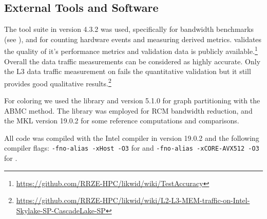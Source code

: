 \subsection{External Tools and Software}
The \LIKWID \cite{LIKWID} tool suite in version 4.3.2 was used, specifically
\likwidBench for bandwidth benchmarks (see ), and
\likwidPerfctr for counting hardware events 
 and measuring derived metrics.
 \LIKWID validates the quality of it's performance metrics
  and validation data is publicly available.\footnote{\href{https://github.com/RRZE-HPC/likwid/wiki/TestAccuracy}{https://github.com/RRZE-HPC/likwid/wiki/TestAccuracy}} Overall the \LIKWID data traffic measurements can be considered as highly accurate. Only the L3 data traffic measurement on \SKX fails the quantitative validation but it still provides good qualitative results.\footnote{\href{https://github.com/RRZE-HPC/likwid/wiki/L2-L3-MEM-traffic-on-Intel-Skylake-SP-CascadeLake-SP}{https://github.com/RRZE-HPC/likwid/wiki/L2-L3-MEM-traffic-on-Intel-Skylake-SP-CascadeLake-SP}}
 
 For coloring we used the \COLPACK \cite{COLPACK} library
 and \METIS \cite{METIS} version 5.1.0 for graph partitioning
 with the \acrshort{ABMC} method. The \SPMP \cite{SpMP} library was employed for
  \acrshort{RCM} bandwidth reduction, and the \acrshort{MKL} version 19.0.2
 for some reference computations and comparisons.

All code was compiled with the Intel compiler in version 19.0.2 and the following compiler flags: {\tt -fno-alias -xHost -O3} for \IVB and {\tt -fno-alias -xCORE-AVX512 -O3} for \SKX.

